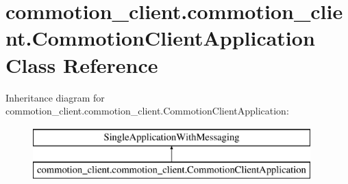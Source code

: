 \hypertarget{classcommotion__client_1_1commotion__client_1_1CommotionClientApplication}{\section{commotion\-\_\-client.\-commotion\-\_\-client.\-Commotion\-Client\-Application Class Reference}
\label{classcommotion__client_1_1commotion__client_1_1CommotionClientApplication}
}
Inheritance diagram for commotion\-\_\-client.\-commotion\-\_\-client.\-Commotion\-Client\-Application\-:\begin{figure}[H]
\begin{center}
\leavevmode
\includegraphics[height=2.000000cm]{classcommotion__client_1_1commotion__client_1_1CommotionClientApplication}
\end{center}
\end{figure}

